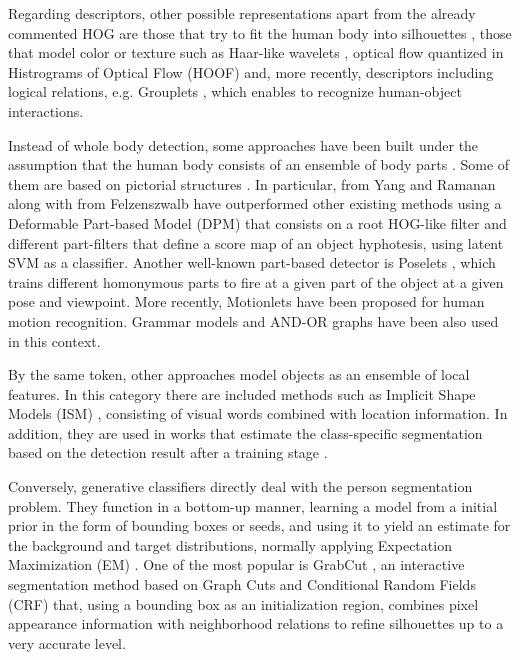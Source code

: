 \documentclass[10pt,twocolumn,letterpaper]{article}
\begin{document}
Regarding descriptors, other possible representations apart from the already commented HOG are those that try to fit the human body into silhouettes \cite{mittal2003human}, those that model color or texture such as Haar-like wavelets \cite{viola2005detecting}, optical flow quantized in Histrograms of Optical Flow (HOOF) \cite{dalal2006human} and, more recently, descriptors including logical relations, e.g. Grouplets \cite{yao2010grouplet}, which enables to recognize human-object interactions.

Instead of whole body detection, some approaches have been built under the assumption that the human body consists of an ensemble of body parts \cite{ramanan2006learning, pirsiavash2012steerable}. Some of them are based on pictorial structures \cite{andriluka2009pictorial, yang2011articulated}. In particular, \cite{yang2011articulated, yang2012articulated} from Yang and Ramanan along with \cite{felzenszwalb2010object} from Felzenszwalb have outperformed other existing methods using a Deformable Part-based Model (DPM) that consists on a root HOG-like filter and different part-filters that define a score map of an object hyphotesis, using latent SVM as a classifier. Another well-known part-based detector is Poselets \cite{bourdev2009poselets, wang2011learning}, which trains different homonymous parts to fire at a given part of the object at a given pose and viewpoint. More recently, Motionlets \cite{wang2013motionlets} have been proposed for human motion recognition. Grammar models \cite{girshick2011object} and AND-OR graphs \cite{zhu2008max} have been also used in this context.

By the same token, other approaches model objects as an ensemble of local features. In this category there are included methods such as Implicit Shape Models (ISM) \cite{leibe2004combined}, consisting of visual words combined with location information. In addition, they are used in works that estimate the class-specific segmentation based on the detection result after a training stage \cite{leibe2008robust}.  

Conversely, generative classifiers directly deal with the person segmentation problem. They function in a bottom-up manner, learning a model from a initial prior in the form of bounding boxes or seeds, and using it to yield an estimate for the background and target distributions, normally applying Expectation Maximization (EM) \cite{shi2000normalized, carson2002blobworld}. One of the most popular is GrabCut \cite{rother2004grabcut, gulshan2011humanising}, an interactive segmentation method based on Graph Cuts \cite{boykov2001interactive} and Conditional Random Fields (CRF) that, using a bounding box as an initialization region, combines pixel appearance information with neighborhood relations to refine silhouettes up to a very accurate level. 
 
\end{document}
